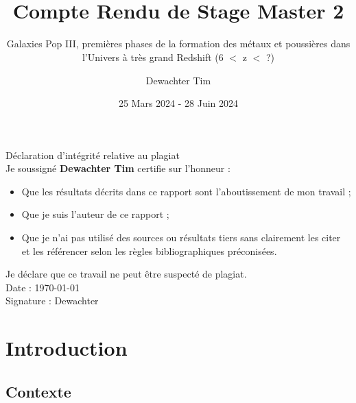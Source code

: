\documentclass[11pt, a4paper]{article}
\title{\textbf{ \\{\Huge Compte Rendu de Stage Master 2}}}
\subtitle{Galaxies Pop III, premières phases de la formation des métaux et poussières dans l'Univers à très grand Redshift (6 $<$ z $<$ ?)}
\author{Dewachter Tim}
\date{25 Mars 2024 - 28 Juin 2024}
\begin{document}
\maketitle

\newpage
\begin{center}
  \vspace*{\fill}

  Déclaration d'intégrité relative au plagiat \\

  

  Je soussigné \textbf{Dewachter Tim} certifie sur l'honneur : \\

  \begin{itemize}
    \centering
    \item Que les résultats décrits dans ce rapport sont l'aboutissement de mon travail ;\\
    \item Que je suis l'auteur de ce rapport ;\\
    \item Que je n'ai pas utilisé des sources ou résultats tiers sans clairement les citer et les référencer selon les règles bibliographiques préconisées.\\
  \end{itemize}

  Je déclare que ce travail ne peut être suspecté de plagiat. \\


  Date : \today\\

  

  Signature : Dewachter

  \vspace*{\fill}
\end{center}
\newpage

\tableofcontents

\newpage

\section{Introduction}

\subsection{Contexte}
\end{document}
